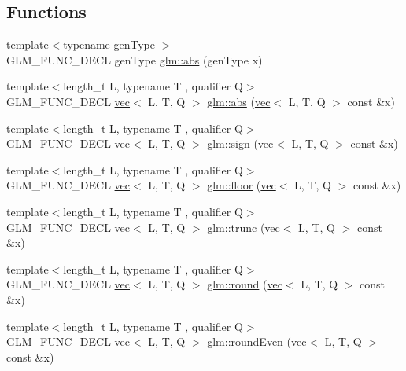 \subsection*{Functions}
\begin{DoxyCompactItemize}
\item 
{\footnotesize template$<$typename gen\+Type $>$ }\\G\+L\+M\+\_\+\+F\+U\+N\+C\+\_\+\+D\+E\+CL gen\+Type \hyperlink{group__core__func__common_ga693d77696ff36572a0da79efec965acd}{glm\+::abs} (gen\+Type x)
\item 
{\footnotesize template$<$length\+\_\+t L, typename T , qualifier Q$>$ }\\G\+L\+M\+\_\+\+F\+U\+N\+C\+\_\+\+D\+E\+CL \hyperlink{structglm_1_1vec}{vec}$<$ L, T, Q $>$ \hyperlink{group__core__func__common_ga3e141c9738c73d3e581efa471dba8b4c}{glm\+::abs} (\hyperlink{structglm_1_1vec}{vec}$<$ L, T, Q $>$ const \&x)
\item 
{\footnotesize template$<$length\+\_\+t L, typename T , qualifier Q$>$ }\\G\+L\+M\+\_\+\+F\+U\+N\+C\+\_\+\+D\+E\+CL \hyperlink{structglm_1_1vec}{vec}$<$ L, T, Q $>$ \hyperlink{group__core__func__common_ga1e2e5cfff800056540e32f6c9b604b28}{glm\+::sign} (\hyperlink{structglm_1_1vec}{vec}$<$ L, T, Q $>$ const \&x)
\item 
{\footnotesize template$<$length\+\_\+t L, typename T , qualifier Q$>$ }\\G\+L\+M\+\_\+\+F\+U\+N\+C\+\_\+\+D\+E\+CL \hyperlink{structglm_1_1vec}{vec}$<$ L, T, Q $>$ \hyperlink{group__core__func__common_gaa9d0742639e85b29c7c5de11cfd6840d}{glm\+::floor} (\hyperlink{structglm_1_1vec}{vec}$<$ L, T, Q $>$ const \&x)
\item 
{\footnotesize template$<$length\+\_\+t L, typename T , qualifier Q$>$ }\\G\+L\+M\+\_\+\+F\+U\+N\+C\+\_\+\+D\+E\+CL \hyperlink{structglm_1_1vec}{vec}$<$ L, T, Q $>$ \hyperlink{group__core__func__common_gaf9375e3e06173271d49e6ffa3a334259}{glm\+::trunc} (\hyperlink{structglm_1_1vec}{vec}$<$ L, T, Q $>$ const \&x)
\item 
{\footnotesize template$<$length\+\_\+t L, typename T , qualifier Q$>$ }\\G\+L\+M\+\_\+\+F\+U\+N\+C\+\_\+\+D\+E\+CL \hyperlink{structglm_1_1vec}{vec}$<$ L, T, Q $>$ \hyperlink{group__core__func__common_gafa03aca8c4713e1cc892aa92ca135a7e}{glm\+::round} (\hyperlink{structglm_1_1vec}{vec}$<$ L, T, Q $>$ const \&x)
\item 
{\footnotesize template$<$length\+\_\+t L, typename T , qualifier Q$>$ }\\G\+L\+M\+\_\+\+F\+U\+N\+C\+\_\+\+D\+E\+CL \hyperlink{structglm_1_1vec}{vec}$<$ L, T, Q $>$ \hyperlink{group__core__func__common_ga76b81785045a057989a84d99aeeb1578}{glm\+::round\+Even} (\hyperlink{structglm_1_1vec}{vec}$<$ L, T, Q $>$ const \&x)

\end{DoxyCompactItemize}

